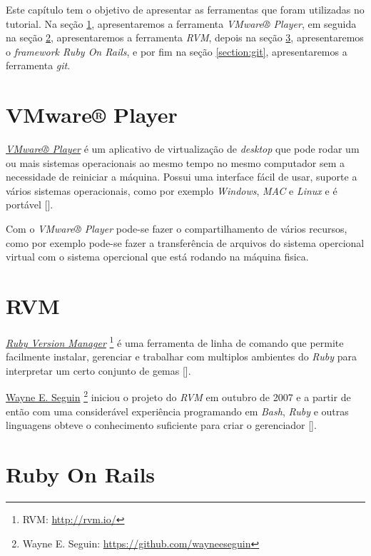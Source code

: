 Este capítulo tem o objetivo de apresentar as ferramentas que foram utilizadas no tutorial. Na seção
\ref{section:vmware_player}, apresentaremos a ferramenta \emph{VMware® Player}, em seguida na seção
\ref{section:rvm}, apresentaremos a ferramenta \emph{RVM}, depois na seção \ref{section:ruby_on_rails},
apresentaremos o \emph{framework Ruby On Rails}, e por fim na seção \ref{section:git}, apresentaremos
a ferramenta \emph{git}.

\section{VMware® Player}
\label{section:vmware_player}

\emph{\href{http://www.vmware.com/products/player}{VMware® Player}} é um aplicativo de virtualização de 
\emph{desktop} que pode rodar um ou mais sistemas operacionais ao mesmo tempo no mesmo computador sem 
a necessidade de reiniciar a máquina. Possui uma interface fácil de usar, suporte a vários sistemas 
operacionais, como por exemplo \emph{Windows}, \emph{MAC} e \emph{Linux} e é portável 
[].

Com o \emph{VMware® Player} pode-se fazer o compartilhamento de vários recursos, como por exemplo pode-se 
fazer a transferência de arquivos do sistema opercional virtual com o sistema opercional que está rodando 
na máquina fisica. 

\section{RVM}
\label{section:rvm}

\emph{\href{http://rvm.io/}{Ruby Version Manager}} \footnote{RVM: \url{http://rvm.io/}} é uma 
ferramenta de linha de comando que permite facilmente instalar, gerenciar e trabalhar com multiplos ambientes 
do \emph{Ruby} para interpretar um certo conjunto de gemas [].

 \href{https://github.com/wayneeseguin}{Wayne E. Seguin} \footnote{Wayne E. Seguin: 
 \url{https://github.com/wayneeseguin}} iniciou o projeto do \emph{RVM} em outubro de 2007
e a partir de então com uma considerável experiência programando em \emph{Bash}, \emph{Ruby} e outras 
linguagens obteve o conhecimento suficiente para criar o gerenciador [].

\section{Ruby On Rails}
\label{section:ruby_on_rails}

